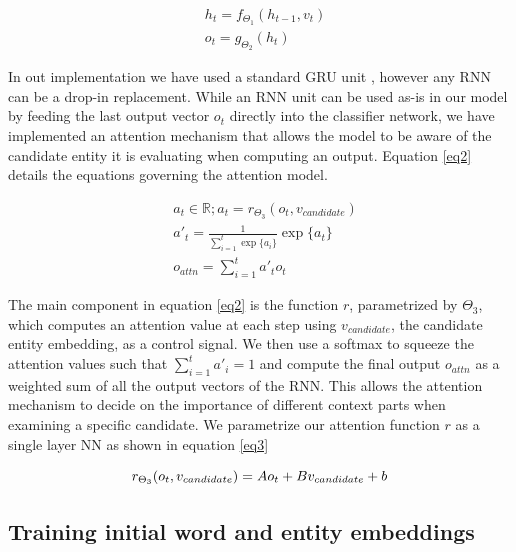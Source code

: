 \documentclass[11pt]{article}
\begin{document}
	\begin{equation}
	\label{eq1}
	\begin{aligned}
	& h_t=f_{\Theta_1}(h_{t-1}, v_t) \\
	& o_t=g_{\Theta_2}(h_t)
	\end{aligned}
	\end{equation}

	In out implementation we have used a standard GRU unit \cite{cho2014learning}, however any RNN can be a drop-in replacement. While an RNN unit can be used as-is in our model by feeding the last output vector $o_t$ directly into the classifier network, we have implemented an attention mechanism that allows the model to be aware of the candidate entity it is evaluating when computing an output. Equation \ref{eq2} details the equations governing the attention model.
	
	\begin{equation}
	\label{eq2}
	\begin{aligned}
	& a_t \in \mathbb{R}; a_t=r_{\Theta_3}(o_t, v_{candidate}) \\
	& a'_t  = \frac{1}{\sum_{i=1}^{t} \exp\{a_i\}} \exp \{a_t\} \\
	& o_{attn}=\sum_{i=1}^{t} a'_t o_t
	\end{aligned}
	\end{equation}
	
	The main component in equation \ref{eq2} is the function $r$, parametrized by $\Theta_3$, which computes an attention value at each step using $v_{candidate}$, the candidate entity embedding, as a control signal. We then use a softmax to squeeze the attention values such that $\sum_{i=1}^{t} a'_i = 1$ and compute the final output $o_{attn}$ as a weighted sum of all the output vectors of the RNN. This allows the attention mechanism to decide on the importance of different context parts when examining a specific candidate. We parametrize our attention function $r$ as a single layer NN as shown in equation \ref{eq3}
	
	\begin{equation}
	\label{eq3}
	r_{\Theta_3}(o_t, v_{candidate}) = Ao_t + Bv_{candidate} + b \\
	\end{equation}
	
	\subsection{Training initial word and entity embeddings}
	
\end{document}
